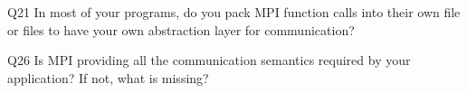 \begin{description}%
\item{Q21} In most of your programs, do you pack MPI function calls into their own file or files to have your own abstraction layer for communication?%
\item{Q26} Is MPI providing all the communication semantics required by your application? If not, what is missing?%
\end{description}%

